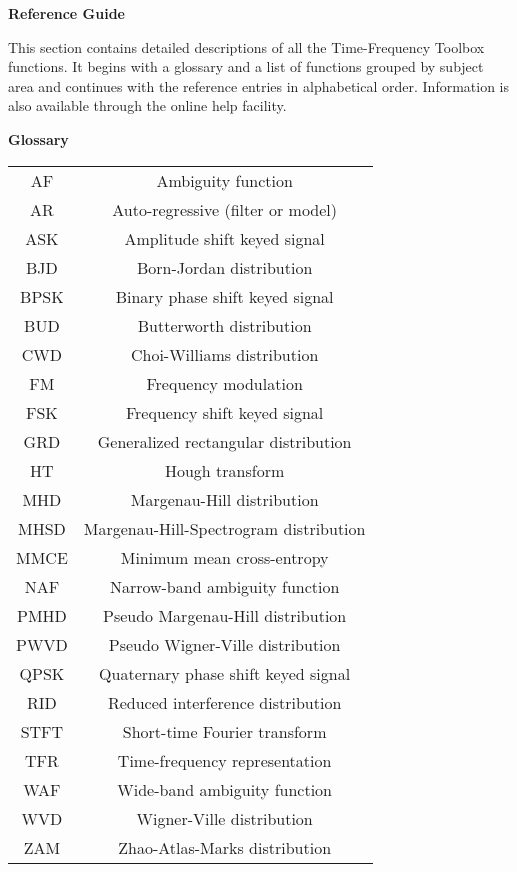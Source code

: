 

\begin{center}
{\bf \huge Reference Guide}
\end{center}

\vspace*{1cm}

This section contains detailed descriptions of all the Time-Frequency Toolbox
functions. It begins with a glossary and a list of functions grouped by
subject area and continues with the reference entries in alphabetical
order. Information is also available through the online help facility.

\vspace*{2cm}

\begin{center} 
{\Large {\bf Glossary}}

\vspace*{1cm}

\begin{tabular}{|c|c|}
\hline 
AF & Ambiguity function\\
AR & Auto-regressive (filter or model)\\
ASK & Amplitude shift keyed signal\\
BJD & Born-Jordan distribution\\
BPSK & Binary phase shift keyed signal\\
BUD & Butterworth distribution\\
CWD & Choi-Williams distribution\\
FM & Frequency modulation\\
FSK & Frequency shift keyed signal\\
GRD & Generalized rectangular distribution\\
HT & Hough transform\\
MHD & Margenau-Hill distribution \\
MHSD & Margenau-Hill-Spectrogram distribution \\ 
MMCE & Minimum mean cross-entropy\\
NAF & Narrow-band ambiguity function\\
PMHD & Pseudo Margenau-Hill distribution\\
PWVD & Pseudo Wigner-Ville distribution\\
QPSK & Quaternary phase shift keyed signal\\
RID & Reduced interference distribution\\
STFT & Short-time Fourier transform\\
TFR & Time-frequency representation\\
WAF & Wide-band ambiguity function\\
WVD & Wigner-Ville distribution\\
ZAM & Zhao-Atlas-Marks distribution\\
\hline 
\end{tabular} 
\end{center}

